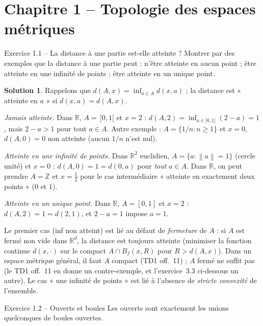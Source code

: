 \documentclass[11pt,a4paper]{article}
\newcommand{\R}{\mathbb{R}}
\newcommand{\Z}{\mathbb{Z}}
\newcommand{\Bf}{B_f}
\newcommand{\norm}[1]{\left\|#1\right\|}
\theoremstyle{definition}
\newtheorem*{solution}{Solution}
\begin{document}
\tableofcontents

\section{Chapitre 1 -- Topologie des espaces métriques}

\begin{exo}{Exercice 1.1 -- La distance à une partie est-elle atteinte ?}
Montrer par des exemples que la distance à une partie peut : n'être atteinte en aucun point ; être atteinte en une infinité de points ; être atteinte en un unique point.
\end{exo}

\begin{solution}
Rappelons que $d(A,x)=\inf_{a\in A}d(x,a)$ ; la distance est « atteinte en $a$ » si $d(x,a)=d(A,x)$.

\emph{Jamais atteinte.} Dans $\R$, $A=\,]0,1[$ et $x=2$ : $d(A,2)=\inf_{a\in]0,1[}(2-a)=1$, mais $2-a>1$ pour tout $a\in A$. Autre exemple : $A=\{1/n : n\ge1\}$ et $x=0$, $d(A,0)=0$ non atteinte (aucun $1/n$ n'est nul).

\emph{Atteinte en une infinité de points.} Dans $\R^2$ euclidien, $A=\{a : \norm a=1\}$ (cercle unité) et $x=0$ : $d(A,0)=1=d(0,a)$ pour \emph{tout} $a\in A$. Dans $\R$, on peut prendre $A=\Z$ et $x=\tfrac12$ pour le cas intermédiaire « atteinte en exactement deux points » ($0$ et $1$).

\emph{Atteinte en un unique point.} Dans $\R$, $A=[0,1]$ et $x=2$ : $d(A,2)=1=d(2,1)$, et $2-a=1$ impose $a=1$.
\end{solution}

\begin{commentaire}
Le premier cas (inf non atteint) est lié au défaut de \emph{fermeture} de $A$ : si $A$ est fermé non vide dans $\R^d$, la distance est toujours atteinte (minimiser la fonction continue $d(x,\cdot)$ sur le compact $A\cap\Bf(x,R)$ pour $R>d(A,x)$). Dans un espace métrique général, il faut $A$ compact (TD1 off.~11) ; $A$ fermé ne suffit pas (le TD1 off.~11 en donne un contre-exemple, et l'exercice~3.3 ci-dessous un autre). Le cas « une infinité de points » est lié à l'absence de \emph{stricte convexité} de l'ensemble.
\end{commentaire}

\begin{exo}{Exercice 1.2 -- Ouverts et boules}
Les ouverts sont exactement les unions quelconques de boules ouvertes.
\end{exo}
\end{document}
